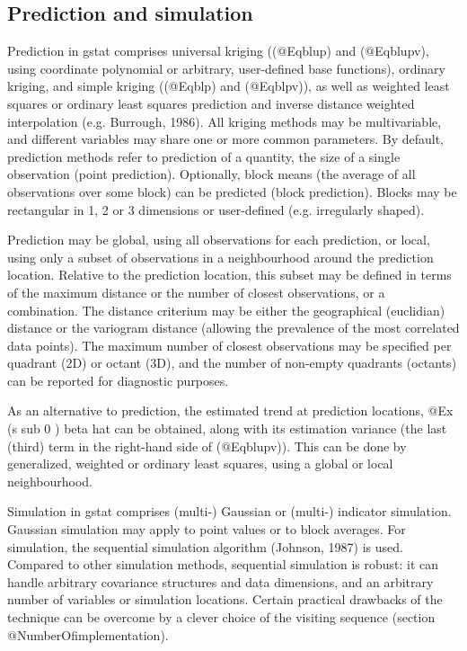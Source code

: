 \documentclass{article}
\begin{document}
\subsection{Prediction and simulation}
Prediction in gstat comprises universal kriging ((@Eqblup) and
(@Eqblupv), using coordinate polynomial or arbitrary, user-defined base
functions), ordinary kriging, and simple kriging ((@Eqblp) and
(@Eqblpv)), as well as weighted least squares or ordinary least squares
prediction and inverse distance weighted interpolation (e.g. Burrough,
1986).  All kriging methods may be multivariable, and different
variables may share one or more common parameters. By default,
prediction methods refer to prediction of a quantity, the size of a
single observation (point prediction). Optionally, block means (the
average of all observations over some block) can be predicted (block
prediction).  Blocks may be rectangular in 1, 2 or 3 dimensions or
user-defined (e.g.  irregularly shaped).

Prediction may be global, using all observations for each prediction, or
local, using only a subset of observations in a neighbourhood around the
prediction location. Relative to the prediction location, this subset
may be defined in terms of the maximum distance or the number of closest
observations, or a combination. The distance criterium may be either the
geographical (euclidian) distance or the variogram distance (allowing
the prevalence of the most correlated data points). The maximum number
of closest observations may be specified per quadrant (2D) or octant
(3D), and the number of non-empty quadrants (octants) can be reported
for diagnostic purposes.

As an alternative to prediction, the estimated trend at prediction
locations, @E{x (s sub 0 ) beta hat} can be obtained, along with its
estimation variance (the last (third) term in the right-hand
side of (@Eqblupv)). This can be done by generalized, weighted or
ordinary least squares, using a global or local neighbourhood.

Simulation in gstat comprises (multi-) Gaussian or (multi-) indicator
simulation. Gaussian simulation may apply to point values or to block
averages. For simulation, the sequential simulation algorithm (Johnson,
1987) is used. Compared to other simulation methods, sequential
simulation is robust: it can handle arbitrary covariance structures and
data dimensions, and an arbitrary number of variables or simulation
locations. Certain practical drawbacks of the technique can be overcome
by a clever choice of the visiting sequence (section
@NumberOf{implementation}).
\end{document}
